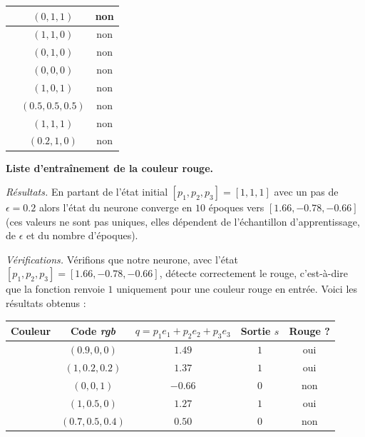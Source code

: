 \documentclass[11pt,class=report,crop=false]{standalone}
\begin{document}
\begin{activite}[Neurone]
\begin{enumerate}
\begin{center}
\begin{tabular}{|c|c|c|}
	\cellcolor{notred1}  & $(0,1,1)$ & non \\ \hline
	\cellcolor{notred2}  & $(1,1,0)$ & non \\ \hline
	\cellcolor{notred3}  & $(0,1,0)$ & non \\ \hline
	\cellcolor{notred4}  & $(0,0,0)$ & non \\ \hline  
	\cellcolor{notred5}  & $(1,0,1)$ & non \\ \hline
	\cellcolor{notred6}  & $(0.5,0.5,0.5)$ & non \\ \hline
	\cellcolor{notred7}  & $(1,1,1)$ & non \\ \hline	
	\cellcolor{notred8}  & $(0.2,1,0)$ & non \\ \hline	
\end{tabular}


{\bf Liste d'entraînement de la couleur rouge.}
\end{center} 

\medskip

	\emph{Résultats.} En partant de l'état initial $[p_1,p_2,p_3]=[1,1,1]$ avec un pas de $\epsilon=0.2$
	alors l'état du neurone converge en $10$ époques vers $[1.66,-0.78,-0.66]$
	(ces valeurs ne sont pas uniques, elles dépendent de l'échantillon d'apprentissage, de $\epsilon$ et du nombre d'époques).
	
	
	
\medskip
	
	\emph{Vérifications.}
	Vérifions que notre neurone, avec l'état $[p_1,p_2,p_3]=[1.66,-0.78,-0.66]$, détecte correctement le rouge, c'est-à-dire que la fonction  renvoie $1$ uniquement pour une couleur rouge en entrée. Voici les résultats obtenus :

	
\begin{center}
	\begin{tabular}{|c|c|c|c|c|}
		\hline
		Couleur &  Code \emph{rgb}  &  $q=p_1 e_1 + p_2e_2+p_3e_3$ & Sortie $s$ & Rouge ?\\ \hline\hline
		
		\cellcolor{isred1}  & $(0.9,0,0)$ & $1.49$ & $1$ & oui \\ \hline
		\cellcolor{isred2}  & $(1,0.2,0.2)$ & $1.37$ & $1$ & oui \\ \hline
		\cellcolor{isred3}  & $(0,0,1)$ & $-0.66$ & $0$ & non \\ \hline
		\cellcolor{isred4}  & $(1,0.5,0)$ & $1.27$ & $1$ & oui \\ \hline  
		\cellcolor{isred5}  & $(0.7,0.5,0.4)$ & $0.50$ & $0$ & non \\ \hline
         

\end{tabular}
\end{center}
\end{enumerate}
\end{activite}
\end{document}
